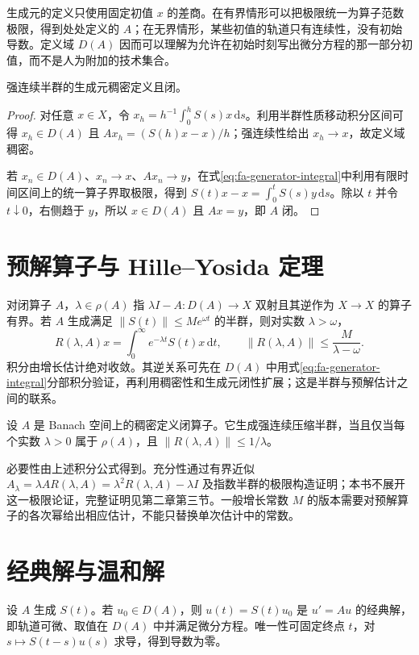 生成元的定义只使用固定初值 $x$ 的差商。在有界情形可以把极限统一为算子范数极限，得到处处定义的 $A$；在无界情形，某些初值的轨道只有连续性，没有初始导数。定义域 $D(A)$ 因而可以理解为允许在初始时刻写出微分方程的那一部分初值，而不是人为附加的技术集合。

\begin{proposition}
强连续半群的生成元稠密定义且闭。
\end{proposition}
\begin{proof}
对任意 $x\in X$，令 $x_h=h^{-1}\int_0^hS(s)x\,\mathrm ds$。利用半群性质移动积分区间可得 $x_h\in D(A)$ 且 $Ax_h=(S(h)x-x)/h$；强连续性给出 $x_h\to x$，故定义域稠密。

若 $x_n\in D(A)$、$x_n\to x$、$Ax_n\to y$，在式\eqref{eq:fa-generator-integral}中利用有限时间区间上的统一算子界取极限，得到 $S(t)x-x=\int_0^tS(s)y\,\mathrm ds$。除以 $t$ 并令 $t\downarrow0$，右侧趋于 $y$，所以 $x\in D(A)$ 且 $Ax=y$，即 $A$ 闭。
\end{proof}

\section{预解算子与 Hille--Yosida 定理}
对闭算子 $A$，$\lambda\in\rho(A)$ 指 $\lambda I-A:D(A)\to X$ 双射且其逆作为 $X\to X$ 的算子有界。若 $A$ 生成满足 $\|S(t)\|\leq Me^{\omega t}$ 的半群，则对实数 $\lambda>\omega$，
\[
 R(\lambda,A)x=\int_0^\infty e^{-\lambda t}S(t)x\,\mathrm dt,
 \qquad\|R(\lambda,A)\|\leq\frac M{\lambda-\omega}.
\]
积分由增长估计绝对收敛。其逆关系可先在 $D(A)$ 中用式\eqref{eq:fa-generator-integral}分部积分验证，再利用稠密性和生成元闭性扩展；这是半群与预解估计之间的联系。

\begin{theorem}
设 $A$ 是 Banach 空间上的稠密定义闭算子。它生成强连续压缩半群，当且仅当每个实数 $\lambda>0$ 属于 $\rho(A)$，且 $\|R(\lambda,A)\|\leq1/\lambda$。
\end{theorem}
必要性由上述积分公式得到。充分性通过有界近似 $A_\lambda=\lambda A R(\lambda,A)=\lambda^2R(\lambda,A)-\lambda I$ 及指数半群的极限构造证明；本书不展开这一极限论证，完整证明见\cite{engel-nagel}第二章第三节。一般增长常数 $M$ 的版本需要对预解算子的各次幂给出相应估计，不能只替换单次估计中的常数。

\section{经典解与温和解}
设 $A$ 生成 $S(t)$。若 $u_0\in D(A)$，则 $u(t)=S(t)u_0$ 是 $u'=Au$ 的经典解，即轨道可微、取值在 $D(A)$ 中并满足微分方程。唯一性可固定终点 $t$，对 $s\mapsto S(t-s)u(s)$ 求导，得到导数为零。

